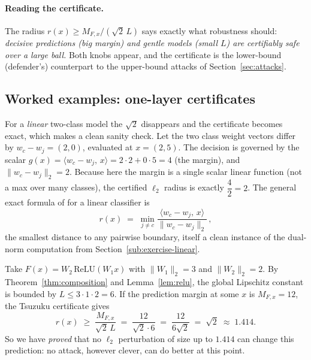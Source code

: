 \paragraph{Reading the certificate.} The radius $r(x)\ge M_{F,x}/(\sqrt2\,L)$ says exactly what robustness should: \emph{decisive predictions (big margin) and gentle models (small $L$) are certifiably safe over a large ball.} Both knobs appear, and the certificate is the lower-bound (defender's) counterpart to the upper-bound attacks of Section~\ref{sec:attacks}.

\subsection{Worked examples: one-layer certificates}
\label{sub:cert-examples}

\begin{example}
For a \emph{linear} two-class model the $\sqrt2$ disappears and the certificate becomes exact, which makes a clean sanity check. Let the two class weight vectors differ by $w_c-w_j=(2,0)$, evaluated at $x=(2,5)$. The decision is governed by the scalar $g(x)=\langle w_c-w_j,\,x\rangle = 2\cdot2 + 0\cdot5 = 4$ (the margin), and $\|w_c-w_j\|_2 = 2$. Because here the margin is a single scalar linear function (not a max over many classes), the certified $\ell_2$ radius is exactly $\dfrac{4}{2}=2$. The general exact formula of \citet{hein2017formal} for a linear classifier is
\[
  r(x) \;=\; \min_{j\neq c}\frac{\langle w_c-w_j,\,x\rangle}{\|w_c-w_j\|_2}\,,
\]
the smallest distance to any pairwise boundary, itself a clean instance of the dual-norm computation from Section~\ref{sub:exercise-linear}.
\end{example}

\begin{example}
Take $F(x)=W_2\,\mathrm{ReLU}(W_1 x)$ with $\|W_1\|_2=3$ and $\|W_2\|_2=2$. By Theorem~\ref{thm:composition} and Lemma~\ref{lem:relu}, the global Lipschitz constant is bounded by $L\le 3\cdot1\cdot2 = 6$. If the prediction margin at some $x$ is $M_{F,x}=12$, the Tsuzuku certificate gives
\[
  r(x) \;\ge\; \frac{M_{F,x}}{\sqrt2\,L} \;=\; \frac{12}{\sqrt2\cdot6} \;=\; \frac{12}{6\sqrt2} \;=\; \sqrt2 \;\approx\; 1.414 .
\]
So we have \emph{proved} that no $\ell_2$ perturbation of size up to $1.414$ can change this prediction: no attack, however clever, can do better at this point.
\end{example}

